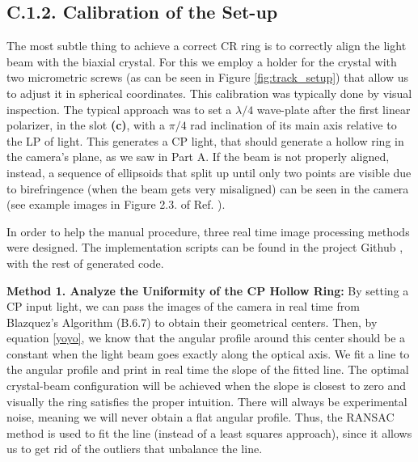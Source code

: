 \documentclass[11pt, a4paper, twoside]{article} %
\begin{document}
\vspace{-0.2cm}
 
\subsection*{C.1.2. Calibration of the Set-up\vspace{-0.1cm}} 

The most subtle thing to achieve a correct CR ring is to correctly align the light beam with the biaxial crystal. For this we employ a holder for the crystal with two micrometric screws (as can be seen in Figure \ref{fig:track_setup}) that allow us to adjust it in spherical coordinates. This calibration was typically done by visual inspection. The typical approach was to set a $\lambda/4$ wave-plate after the first linear polarizer, in the slot {\bf (c)}, with a $\pi/4$ rad inclination of its main axis relative to the LP of light. This generates a CP light, that should generate a hollow ring in the camera's plane, as we saw in Part A. If the beam is not properly aligned, instead, a sequence of ellipsoids that split up until only two points are visible due to birefringence (when the beam gets very misaligned) can be seen in the camera (see example images in Figure 2.3. of Ref. \cite{Turpin}).

In order to help the manual procedure, three real time image processing methods were designed. The implementation scripts can be found in the project Github \cite{github}, with the rest of generated code.

{\bf Method 1. Analyze the Uniformity of the CP Hollow Ring:} By setting a CP input light, we can pass the images of the camera in real time from Blazquez's Algorithm (B.6.7) to obtain their geometrical centers. Then, by equation \eqref{yoyo}, we know that the angular profile around this center should be a constant when the light beam goes exactly along the optical axis. We fit a line to the angular profile and print in real time the slope of the fitted line. The optimal crystal-beam configuration will be achieved when the slope is closest to zero and visually the ring satisfies the proper intuition. There will always be experimental noise, meaning we will never obtain a flat angular profile. Thus, the RANSAC method \cite{RANSAC} is used to fit the line (instead of a least squares approach), since it allows us to get rid of the outliers that unbalance the line.
\end{document}
